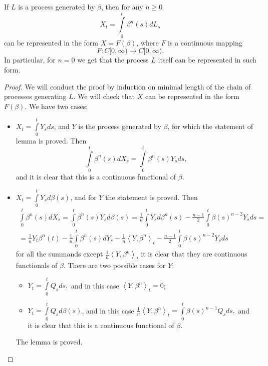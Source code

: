 \documentclass[12pt, a4paper, titlepage]{article}
\begin{document}
\begin{lem}\label{WienerCalculusLem}
 If $L$ is a process generated by $\beta$, 
then for any $n \ge 0$
$$X_t=\int\limits_0^t \beta^n(s)dL_s$$
can be represented in the form $X=F(\beta)$,
where $F$ is a continuous mapping
$$F \colon C[0, \infty) \to C[0, \infty).$$
In particular, for $n=0$ we get that the process $L$ itself
can be represented in such form.  
\end{lem}
\begin{proof}
 We will conduct the proof by induction 
 on minimal length of the chain of processes generating $L$. 
We will check that $X$ can be represented in the form $F(\beta)$. 
We have two cases: 
\begin{itemize}
 \item $X_t = \int\limits_0^t Y_s ds$, and $Y$ is the process generated by $\beta$,
for which the statement of lemma is proved. Then 
$$\int\limits_0^t \beta^n(s)dX_s = \int\limits_0^t \beta^n(s) Y_s ds,$$
and it is clear that this is a continuous functional of $\beta$. 
 \item $X_t = \int\limits_0^t Y_s d\beta(s)$, and for $Y$ the statement is proved.
Then
\begin{multline*}
 \int\limits_0^t \beta^n(s)dX_s = \int\limits_0^t \beta^n(s) Y_s d\beta(s)=
 \frac{1}{n}\int\limits_0^t Y_s d\beta^n(s)-\frac{n-1}{2}\int\limits_0^t \beta(s)^{n-2} Y_s ds=\\=
 \frac{1}{n}Y_t \beta^n(t)-\frac{1}{n}\int\limits_0^t \beta^n(s)dY_s-
 \frac{1}{n}\left<Y, \beta^n\right>_t-
 \frac{n-1}{2}\int\limits_0^t \beta(s)^{n-2} Y_s ds
\end{multline*}
for all the summands except $\frac{1}{n}\left<Y, \beta^n\right>_t$
it is clear that they are continuous functionals of $\beta$. 
There are two possible cases for $Y$: 
\begin{itemize}
\item $Y_t=\int\limits_0^t Q_s ds,$ and in this case
$\left<Y, \beta^n\right>_t=0$; 
\item $Y_t=\int\limits_0^t Q_s d\beta(s)$,
and in this case 
$\frac{1}{n}\left<Y, \beta^n\right>_t=\int\limits_0^t \beta(s)^{n-1}Q_s ds,$
and it is clear that this is a continuous functional of $\beta$. 
\end{itemize}
The lemma is proved. 
\end{itemize}
\end{proof}
\end{document}
